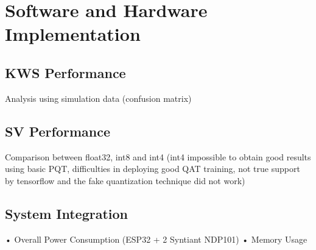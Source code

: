 \chapter{Software and Hardware Implementation}
\label{cha:results}
\section{KWS Performance}
\label{sec:kws performance}
Analysis using simulation data (confusion matrix)\newline 
\section{SV Performance}
\label{sec:sv performance}
Comparison between float32, int8 and int4 (int4 impossible to obtain good results using basic PQT, difficulties in deploying good QAT training, not true support by tensorflow and the fake quantization technique did not work)\newline 
\section{System Integration}
\label{sec: system integration}
• Overall Power Consumption (ESP32 + 2 Syntiant NDP101)\newline
• Memory Usage\newline 

\newpage

